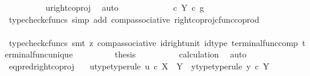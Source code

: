 \begin{isabellebody}
\ \ \ \ \ \ \ \ \isamarkupfalse%
\ u{\isacharunderscore}{\kern0pt}right{\isacharunderscore}{\kern0pt}coproj\ \isamarkupfalse%
\ auto\isanewline
\ \ \ \ \ \ \isamarkupfalse%
\ \isamarkupfalse%
\ {\isachardoublequoteopen}{\isachardot}{\kern0pt}{\isachardot}{\kern0pt}{\isachardot}{\kern0pt}\ {\isacharequal}{\kern0pt}\ {\isacharparenleft}{\kern0pt}{\isasymf}\ {\isasymcirc}\isactrlsub c\ {\isasymbeta}\isactrlbsub Y\isactrlesub {\isacharparenright}{\kern0pt}\ {\isasymcirc}\isactrlsub c\ g{\isachardoublequoteclose}\isanewline
\ \ \ \ \ \ \ \ \isamarkupfalse%
\ {\isacharparenleft}{\kern0pt}typecheck{\isacharunderscore}{\kern0pt}cfuncs{\isacharcomma}{\kern0pt}\ simp\ add{\isacharcolon}{\kern0pt}\ comp{\isacharunderscore}{\kern0pt}associative{}\ right{\isacharunderscore}{\kern0pt}coproj{\isacharunderscore}{\kern0pt}cfunc{\isacharunderscore}{\kern0pt}coprod{\isacharparenright}{\kern0pt}\isanewline
\ \ \ \ \ \ \isamarkupfalse%
\ \isamarkupfalse%
\ {\isachardoublequoteopen}{\isachardot}{\kern0pt}{\isachardot}{\kern0pt}{\isachardot}{\kern0pt}\ {\isacharequal}{\kern0pt}\ {\isasymf}{\isachardoublequoteclose}\isanewline
\ \ \ \ \ \ \ \ \isamarkupfalse%
\ {\isacharparenleft}{\kern0pt}typecheck{\isacharunderscore}{\kern0pt}cfuncs{\isacharcomma}{\kern0pt}\ smt\ {\isacharparenleft}{\kern0pt}z{}{\isacharparenright}{\kern0pt}\ comp{\isacharunderscore}{\kern0pt}associative{}\ id{\isacharunderscore}{\kern0pt}right{\isacharunderscore}{\kern0pt}unit{}\ id{\isacharunderscore}{\kern0pt}type\ terminal{\isacharunderscore}{\kern0pt}func{\isacharunderscore}{\kern0pt}comp\ terminal{\isacharunderscore}{\kern0pt}func{\isacharunderscore}{\kern0pt}unique{\isacharparenright}{\kern0pt}\isanewline
\ \ \ \ \ \ \isamarkupfalse%
\ \isamarkupfalse%
\ {\isacharquery}{\kern0pt}thesis\isanewline
\ \ \ \ \ \ \ \ \isamarkupfalse%
\ calculation\ \isamarkupfalse%
\ auto\isanewline
\ \ \ \ \isamarkupfalse%
\isanewline
\ \ \isamarkupfalse%
\isanewline
{}\isamarkupfalse%
%
\endisatagproof
{\isafoldproof}%
%
\isadelimproof
\isanewline
%
\endisadelimproof
\isanewline
{}\isamarkupfalse%
\ eq{\isacharunderscore}{\kern0pt}pred{\isacharunderscore}{\kern0pt}right{\isacharunderscore}{\kern0pt}coproj{\isacharcolon}{\kern0pt}\isanewline
\ \ \ u{\isacharunderscore}{\kern0pt}type{\isacharbrackleft}{\kern0pt}type{\isacharunderscore}{\kern0pt}rule{\isacharbrackright}{\kern0pt}{\isacharcolon}{\kern0pt}\ {\isachardoublequoteopen}u\ {\isasymin}\isactrlsub c\ X\ {\isasymCoprod}\ Y{\isachardoublequoteclose}\ \ y{\isacharunderscore}{\kern0pt}type{\isacharbrackleft}{\kern0pt}type{\isacharunderscore}{\kern0pt}rule{\isacharbrackright}{\kern0pt}{\isacharcolon}{\kern0pt}\ {\isachardoublequoteopen}y\ {\isasymin}\isactrlsub c\ Y{\isachardoublequoteclose}\isanewline

\end{isabellebody}
